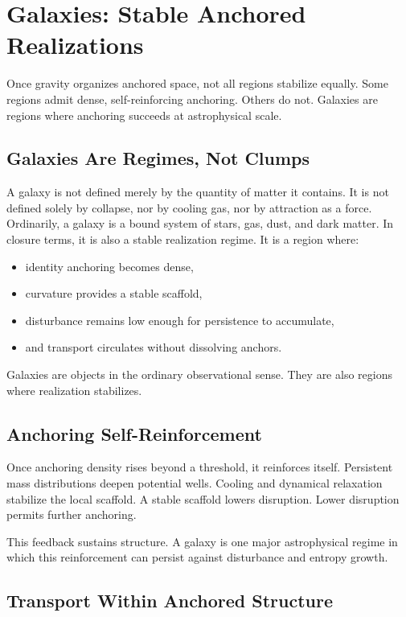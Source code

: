 \documentclass[11pt,twoside,openright]{book}
\begin{document}
\chapter{Galaxies: Stable Anchored Realizations}

Once gravity organizes anchored space, not all regions stabilize equally. Some regions admit dense, self-reinforcing anchoring. Others do not. Galaxies are regions where anchoring succeeds at astrophysical scale.

\section*{Galaxies Are Regimes, Not Clumps}

A galaxy is not defined merely by the quantity of matter it contains. It is not defined solely by collapse, nor by cooling gas, nor by attraction as a force. Ordinarily, a galaxy is a bound system of stars, gas, dust, and dark matter. In closure terms, it is also a stable realization regime. It is a region where:

\begin{itemize}
\item identity anchoring becomes dense,
\item curvature provides a stable scaffold,
\item disturbance remains low enough for persistence to accumulate,
\item and transport circulates without dissolving anchors.
\end{itemize}

Galaxies are objects in the ordinary observational sense. They are also regions where realization stabilizes.

\section*{Anchoring Self-Reinforcement}

Once anchoring density rises beyond a threshold, it reinforces itself. Persistent mass distributions deepen potential wells. Cooling and dynamical relaxation stabilize the local scaffold. A stable scaffold lowers disruption. Lower disruption permits further anchoring.

This feedback sustains structure. A galaxy is one major astrophysical regime in which this reinforcement can persist against disturbance and entropy growth.

\section*{Transport Within Anchored Structure}
\end{document}

